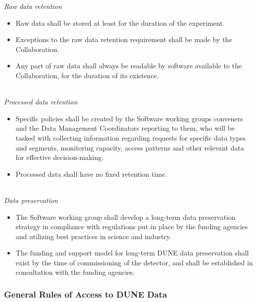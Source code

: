 \textit{Raw data retention}
\begin{itemize}
\item Raw data shall be stored at least for the duration of the experiment.

\item Exceptions to the raw data retention requirement shall be made by the Collaboration.

\item Any part of raw data shall always be readable by software available to the Collaboration, for the duration of its existence.

\end{itemize}
\ 
\\
\textit{Processed data retention}
\begin{itemize}
\item Specific policies shall be created by the Software working groups conveners and the Data Management Coordinators reporting to them, who will be tasked with collecting information regarding requests for specific data types and segments, monitoring capacity, access patterns and other relevant data for effective decision-making. 

\item Processed data shall have no fixed retention time.
\end{itemize}
\ 
\\
\textit{Data preservation}
\label{sec:lbnepres}
\begin{itemize}
\item The Software working group shall develop a long-term data preservation strategy in compliance with regulations put in place by the funding agencies and utilizing best practices in science and industry.

\item The funding and support model for long-term DUNE data preservation shall exist by the time of commissioning of the detector, and shall be established in consultation with the funding agencies.
\end{itemize}

\subsubsection{General Rules of Access to DUNE Data}

